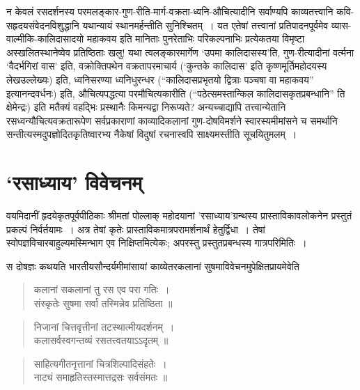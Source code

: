 {\dev न केवलं रसदर्शनस्य परमलङ्कार-गुण-रीति-मार्ग-वक्रता-ध्वनि-औचित्यादीनि सर्वाण्यपि काव्यतत्त्वानि कवि-सहृदयसंवेदनविशुद्धानि यथान्यायं स्थानमर्हन्तीति सुनिश्चितम्~। यत एतेषां तत्त्वानां प्रतिपादनपूर्वमेव व्यास-वाल्मीकि-कालिदासादयो महाकवय इति मानिताः पुनरेताभिः परिकल्पनाभिः प्रत्येकतया विमृष्टा अस्खलितस्थानेष्वेव प्रतिष्ठिताः खलु! यथा त्वलङ्कारमार्गेण `उपमा कालिदासस्य'ति, गुण-रीत्यादीनां वर्त्मना `वैदर्भगिरां वास' इति, वक्रोक्तिपथेन वक्रतापरमाचार्य (`कुन्तके कालिदास' इति कृष्णमूर्तिमहोदयस्य लेख\break उल्लेख्यः) इति, ध्वनिसरण्या ध्वनिधुरन्धर (``कालिदासप्रभृतयो द्वित्राः पञ्चषा वा महाकवय'' इत्यानन्द\-वर्धनः) इति, औचित्यपद्धत्या परमौचित्यकारीति (``पठेत्समस्तान्किल कालिदास\-कृत\-प्रब\-न्धानि'' ति क्षेमेन्द्रः) इति मतैक्यं वहद्भिः प्रस्थानैः किमन्यद्वा निरूप्यते? अन्यच्चाद्यापि तत्त्वान्येतानि रसध्वन्यौचित्यवक्रतारूपेण सर्वप्रकाराणां काव्यादिकलानां गुण-दोषविमर्शने स्वारस्यमीमांसने च समर्थानि सन्तीत्यस्मदुपज्ञोदितकृतिष्वारभ्य नैकेषां विदुषां रचनास्वपि साक्ष्यमस्तीति सूचयितुमलम्~।} 

\section*{{\dev `रसाध्याय' विवेचनम्}}

{\dev वयमिदानीं हृदयेकृतपूर्वपीठिकाः श्रीमतां पोल्लाक् महोदयानां ’रसाध्याय’ग्रन्थस्य प्रास्तावि\-काव\-लोकनेन प्रस्तुतं प्रकल्पं निर्वर्तयामः~। अत्र तेषां कृतेः प्रास्ताविकमात्रपरामर्शनार्थं हेतु\-र्द्विधा~। तेषां स्वोपज्ञविचारबाहुल्यमस्मिन्भाग एव निक्षिप्तमित्येकः; अपरस्तु प्रस्तुतप्रबन्धस्य गात्र\-परिमितिः~।}

{\dev स दोषज्ञः कथयति भारतीयसौन्दर्यमीमांसायां काव्येतरकलानां सुषमाविवेचनमुपेक्षितप्राय\-मेवेति}  
\begin{quote}
{\dev कलानां सकलानां तु रस एव परा गतिः~।}\\
{\dev संस्कृतेः सुषमा सर्वा तस्मिन्नेव प्रतिष्ठिता ॥}
\end{quote}
\begin{quote}
{\dev निजानां चित्तवृत्तीनां तटस्थात्मीयदर्शनम्~।}\\
{\dev कलासर्वस्वगन्तव्यं रसतत्त्वतयाऽऽदृतम् ॥}
\end{quote}
\begin{quote}
{\dev साहित्यगीतनृत्तानां चित्रशिल्पादिसंहतेः~।}\\
{\dev नाट्यं समाहृतिस्तस्मात्तद्रसः सर्वसंमतः ॥}
\end{quote}

